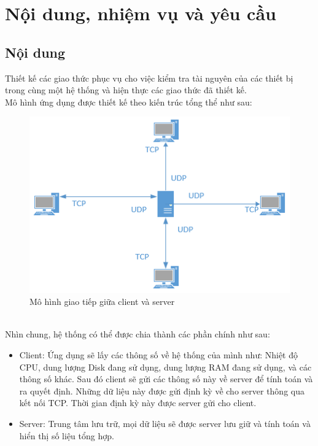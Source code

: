 \documentclass[a4paper,11pt]{extarticle}
\begin{document}

\newpage
\tableofcontents
\newpage

\section{Nội dung, nhiệm vụ và yêu cầu}
\subsection{Nội dung}
Thiết kế các giao thức phục vụ cho việc kiểm tra tài nguyên của các thiết bị trong cùng một hệ thống và hiện thực các giao thức đã thiết kế. \\
Mô hình ứng dụng được thiết kế theo kiến trúc tổng thể như sau:
\begin{figure}[htbp]
    \centering
    \includegraphics{Model.png}
    \caption{Mô hình giao tiếp giữa client và server}
    \label{fig:my_label}
\end{figure} \\
Nhìn chung, hệ thống có thể được chia thành các phần chính như sau:
\begin{itemize}[noitemsep]
    \item Client: Ứng dụng sẽ lấy các thông số về hệ thống của mình như: Nhiệt độ CPU, dung lượng Disk đang sử dụng, dung lượng RAM đang sử dụng, và các thông số khác. Sau đó client sẽ gửi các thông số này về server để tính toán và ra quyết định. Những dữ liệu này được gửi định kỳ về cho server thông qua kết nối TCP. Thời gian định kỳ này được server gửi cho client.
    \item Server: Trung tâm lưu trữ, mọi dữ liệu sẽ được server lưu giữ và tính toán và hiển thị số liệu tổng hợp.
\end{itemize}
\end{document}
